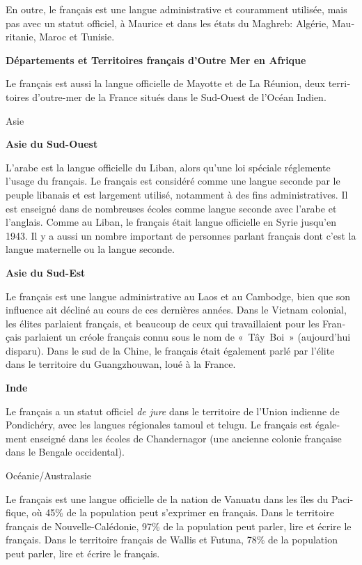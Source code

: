 \begin{french}
\begin{multicols}{2}
En outre, le français est une langue administrative et couramment
utilisée, mais pas avec un statut officiel, à Maurice et dans les
états du Maghreb: Algérie, Mauritanie, Maroc et Tunisie.

{\bf Départements et Territoires français d'Outre Mer en Afrique}

Le français est aussi la langue officielle de Mayotte et de La
Réunion, deux territoires d'outre-mer de la France situés dans
le Sud-Ouest de l'Océan Indien.

\begin{center}
{\sc Asie}
\end{center}

{\bf Asie du Sud-Ouest}

L'arabe est la langue officielle du Liban, alors qu'une 
loi spéciale réglemente l'usage du français. Le
français est considéré comme une langue seconde par le peuple libanais
et est largement utilisé, notamment à des fins administratives. Il est
enseigné dans de nombreuses écoles comme langue seconde avec l'arabe et l'anglais. Comme au Liban, le français était
langue officielle en Syrie jusqu'en 1943. Il y a aussi un
nombre important de personnes parlant français dont c'est la
langue maternelle ou la langue seconde.

{\bf Asie du Sud-Est}

Le français est une langue administrative au
Laos et au Cambodge, bien que son influence ait décliné au cours de
ces dernières années. Dans le Vietnam colonial, les élites parlaient
français, et beaucoup de ceux qui travaillaient pour les Français
parlaient un créole français connu sous le nom de «~Tây~Boi~»
(aujourd'hui disparu).  Dans le sud de la Chine, le français
était également parlé par l'élite dans le territoire du
Guangzhouwan, loué à la France.

{\bf Inde}

Le français a un statut officiel {\em de jure} dans le territoire de l'Union indienne de Pondichéry, avec les langues régionales tamoul
et telugu. Le français est également enseigné dans les écoles de
Chandernagor (une ancienne colonie française dans le Bengale
occidental).

\begin{center}
{\sc Océanie/Australasie}
\end{center}

Le français est une langue officielle de la nation de Vanuatu dans les
îles du Pacifique, où 45\% de la population peut s'exprimer en
français. Dans le territoire français de Nouvelle-Calédonie, 97\% de
la population peut parler, lire et écrire le français. Dans le
territoire français de Wallis et Futuna, 78\% de la population peut
parler, lire et écrire le français.


\end{multicols}
\end{french}
